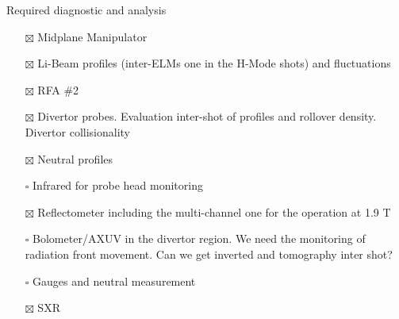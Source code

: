\documentclass[10pt, compress]{beamer}
\begin{document}
\begin{frame}{Required diagnostic and analysis}
  \begin{itemize}
    \item[$\boxtimes$] Midplane Manipulator
    \item[$\boxtimes$] Li-Beam profiles (inter-ELMs one in the H-Mode
      shots) and fluctuations
    \item[$\boxtimes$] RFA \#2
    \item[$\boxtimes$] Divertor probes. Evaluation inter-shot of
      profiles and rollover density. Divertor collisionality
    \item[$\boxtimes$] Neutral profiles
    \item[$\square$] Infrared for probe head monitoring
    \item[$\boxtimes$] Reflectometer including the multi-channel one
      for the operation at 1.9 T
    \item[$\square$] Bolometer/AXUV in the divertor region. We need
      the monitoring of radiation front movement. Can we get inverted
      and tomography inter shot?
    \item[$\square$] Gauges and neutral measurement
    \item[$\boxtimes$] SXR 
    \end{itemize}
\end{frame}
\end{document}
